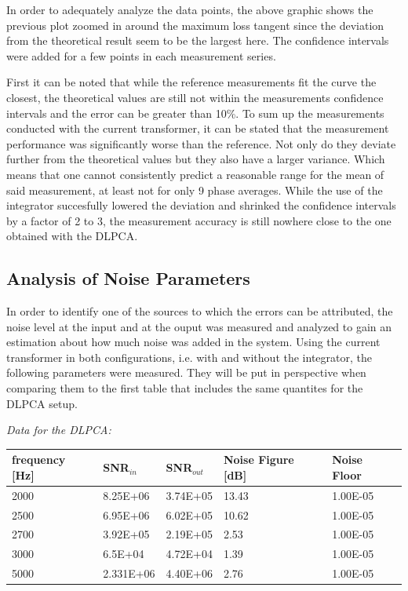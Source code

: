 In order to adequately analyze the data points, the above graphic shows the previous plot
zoomed in around the maximum loss tangent since the deviation from the theoretical result seem to be the largest here.
The confidence intervals were added for a few points in each measurement series.

First it can be noted that while the reference measurements fit the curve the closest, the theoretical values are still not
within the measurements confidence intervals and the error can be greater than 10\%. To sum up the measurements conducted with
the current transformer, it can be stated that the measurement performance was significantly worse than the reference. Not only do they deviate further from the theoretical values
but they also have a larger variance. Which means that one cannot consistently predict a reasonable range for the mean of said measurement, at least not for only 9 phase averages.
While the use of the integrator succesfully lowered the deviation and shrinked the confidence intervals by a factor of 2 to 3, the measurement accuracy is still nowhere close to the one obtained with the DLPCA.

\subsection{Analysis of Noise Parameters}

In order to identify one of the sources to which the errors can be attributed, the noise level at the input and at the ouput was measured and analyzed to gain an estimation about how much noise was added in the system.
Using the current transformer in both configurations, i.e. with and without the integrator, the following parameters were measured. They will be put in perspective when comparing them to the first table that includes the same quantites for the DLPCA setup.


\textit{Data for the DLPCA:}


\begin{center}
\begin{tabular}{|m{3cm}|m{3cm}|m{2.5cm}|m{3.2cm}|m{2cm}|} 
\hline
frequency [Hz]& SNR$_{in}$ & SNR$_{out}$ & Noise Figure [dB] & Noise Floor \\ 
\hline \hline
2000 &  8.25E+06 &  3.74E+05 & 13.43 & 1.00E-05 \\ 
\hline
2500 & 6.95E+06 & 6.02E+05 & 10.62 & 1.00E-05 \\ 
\hline
2700 & 3.92E+05 & 2.19E+05 & 2.53 & 1.00E-05 \\ 
\hline
3000 & 6.5E+04 & 4.72E+04 & 1.39 & 1.00E-05 \\ 
\hline
5000 & 2.331E+06 & 4.40E+06 & 2.76 & 1.00E-05 \\ 
\hline
\end{tabular}
\end{center}


